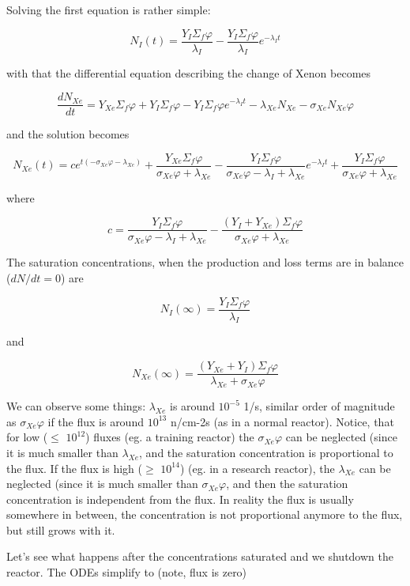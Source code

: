 Solving the first equation is rather simple:

$$ N_I(t)=\frac{Y_I\Sigma_f\varphi}{\lambda_I} - \frac{Y_I\Sigma_f\varphi}{\lambda_I}e^{-\lambda_It} $$

\noindent with that the differential equation describing the change of Xenon becomes

$$ \frac{dN_{Xe}}{dt}=Y_{Xe}\Sigma_f\varphi + Y_I\Sigma_f\varphi - Y_I\Sigma_f\varphi e^{-\lambda_It} -\lambda_{Xe}N_{Xe} - \sigma_{Xe}N_{Xe}\varphi  $$

\noindent and the solution becomes

$$ N_{Xe}(t) = c e^{t(-\sigma_{Xe}\varphi - \lambda_{Xe})} + \frac{Y_{Xe}\Sigma_f\varphi}{\sigma_{Xe}\varphi + \lambda_{Xe}} - \frac{Y_I\Sigma_f\varphi}{\sigma_{Xe}\varphi-\lambda_I + \lambda_{Xe}}e^{-\lambda_It} + \frac{Y_{I}\Sigma_f\varphi}{\sigma_{Xe}\varphi + \lambda_{Xe}}  $$

\noindent where 

$$ c= \frac{Y_I\Sigma_f\varphi}{\sigma_{Xe}\varphi-\lambda_I + \lambda_{Xe}}  -\frac{(Y_{I}+Y_{Xe})\Sigma_f\varphi}{\sigma_{Xe}\varphi + \lambda_{Xe}}   $$


The saturation concentrations, when the production and loss terms are in balance ($dN/dt = 0$) are

$$N_I(\infty) = \frac{Y_I\Sigma_f\varphi}{\lambda_I} $$

\noindent and 

$$N_{Xe}(\infty) = \frac{(Y_{Xe}+Y_I)\Sigma_f\varphi}{\lambda_{Xe} + \sigma_{Xe}\varphi} $$

We can observe some things: $\lambda_{Xe}$ is around $10^{-5}$ 1/s, similar order of magnitude as $\sigma_{Xe}\varphi$ if the flux is around $10^{13}$ n/cm-2s (as in a normal reactor).  Notice, that for low ($\leq$ $10^{12}$) fluxes (eg. a training reactor)  the $\sigma_{Xe}\varphi$ can be neglected (since it is much smaller than $\lambda_{Xe}$, and the saturation concentration is proportional to the flux. If the flux is high ($\geq$ $10^{14}$) (eg. in a research reactor), the $\lambda_{Xe}$ can be neglected (since it is much smaller than $\sigma_{Xe}\varphi$, and then the saturation concentration is independent from the flux. In reality the flux is usually somewhere in between, the concentration is not proportional anymore to the flux, but still grows with it.


Let's see what happens after the concentrations saturated and we shutdown the reactor. The ODEs simplify to (note, flux is zero)


